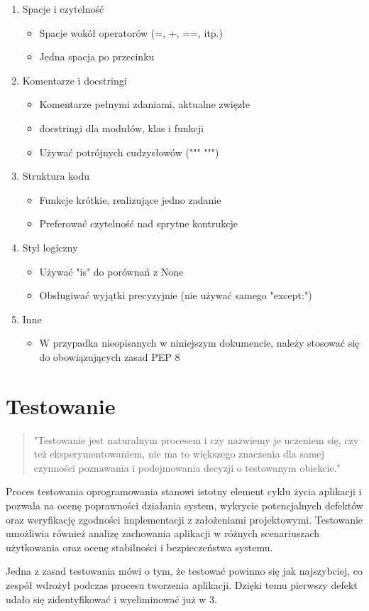 \begin{enumerate}
    \item Spacje i czytelność
    \begin{itemize}
        \item Spacje wokół operatorów (=, +, ==, itp.)
        \item Jedna spacja po przecinku
    \end{itemize}
    \item Komentarze i \gls{docstring}i
    \begin{itemize}
        \item Komentarze pełnymi zdaniami, aktualne zwięzłe
        \item \Gls{docstring}i dla modułów, klas i funkcji
        \item Używać potrójnych cudzysłowów (""" """)
    \end{itemize}
    \item Struktura kodu
    \begin{itemize}
        \item Funkcje krótkie, realizujące jedno zadanie
        \item Preferować czytelność nad sprytne kontrukcje
    \end{itemize}
    \item Styl logiczny
    \begin{itemize}
        \item Używać "is" do porównań z None
        \item Obsługiwać wyjątki precyzyjnie (nie używać samego "except:")
    \end{itemize}
    \item Inne
    \begin{itemize}
        \item W przypadka nieopisanych w niniejszym dokumencie, należy stosować się do obowiązujących zasad \gls{PEP 8} \cite{pep8}
    \end{itemize}
\end{enumerate}

\section{Testowanie}
\begin{quote}
"Testowanie jest naturalnym procesem i czy nazwiemy je uczeniem się, czy też eksperymentowaniem, nie ma to większego znaczenia dla samej czynności poznawania i podejmowania decyzji o testowanym obiekcie." ~\cite{smilgin2018tester}
\end{quote}
\par
Proces testowania oprogramowania stanowi istotny element cyklu życia aplikacji i pozwala na ocenę poprawności działania system, wykrycie potencjalnych defektów oraz weryfikację zgodności implementacji z założeniami projektowymi.
Testowanie umożliwia również analizę zachowania aplikacji w różnych scenariuszach użytkowania oraz ocenę stabilności i bezpieczeństwa systemu.
\par
Jedna z zasad testowania mówi o tym, że testować powinno się jak najszybciej, co zespół wdrożył podczas procesu tworzenia aplikacji.
Dzięki temu pierwszy defekt udało się zidentyfikować i wyeliminować już w  3.

